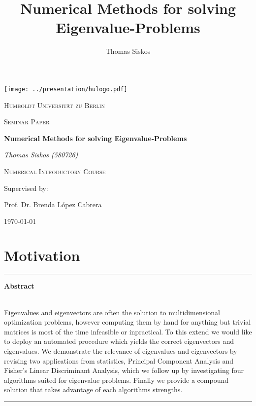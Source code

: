 \documentclass[12pt]{article}
\renewenvironment{abstract}{%

\begin{center}
\begin{minipage}{0.9\textwidth}
\rule{\textwidth}{1pt}}
{\par\noindent\rule{\textwidth}{1pt}
\end{minipage}
\end{center}}
\begin{document}
\title{Numerical Methods for solving Eigenvalue-Problems}
\author{Thomas Siskos}
\date{}

\begin{titlepage}
  \begin{center}

  \texttt{[image: ../presentation/hulogo.pdf]} \par
  {\scshape\LARGE Humboldt Universit{\"a}t zu Berlin \par}

  {\scshape\Large Seminar Paper\par}

  {\huge\bfseries Numerical Methods for solving Eigenvalue-Problems\par}

\vspace{1cm}

  {\Large\itshape Thomas Siskos (580726)\par}

  {\Large\scshape Numerical Introductory Course\par}

  \vfill
  Supervised by: \par
  {\Large Prof. Dr. Brenda L{\'o}pez Cabrera \par}
  \vfill
  {\large \today\par}
  \end{center}

\end{titlepage}

\tableofcontents
\newpage
\listofalgorithms
\listoffigures
\listoftables
\newpage

\section{Motivation}

\begin{singlespacing}
\begin{abstract}
\centerline{\textbf{Abstract}} \\
\small
Eigenvalues and eigenvectors are often the solution to multidimensional optimization problems, however computing them by hand for anything but trivial matrices is most of the time infeasible or inpractical. To this extend we would like to deploy an automated procedure which yields the correct eigenvectors and eigenvalues. We demonstrate the relevance of eigenvalues and eigenvectors by revising two applications from statistics, Principal Component Analysis and Fisher's Linear Discriminant Analysis, which we follow up by investigating four algorithms suited for eigenvalue problems. Finally we provide a compound solution that takes advantage of each algorithms strengths.
\end{abstract}
\vspace{3mm}
\end{singlespacing}
\end{document}

